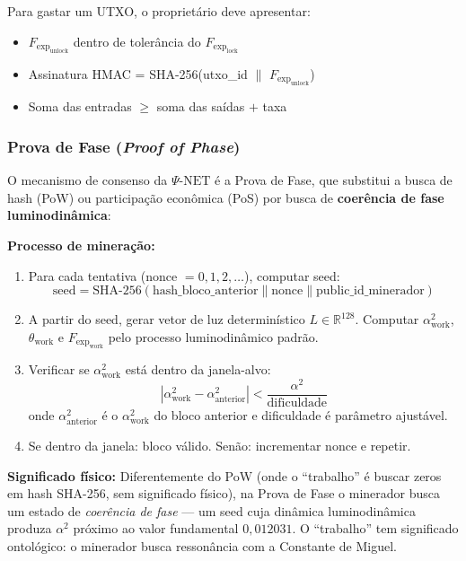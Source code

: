 \documentclass[12pt,a4paper]{article}
\newcommand{\alphaii}{\alpha^2}
\newcommand{\Fexp}{F_{\text{exp}}}
\newcommand{\PsiNet}{\Psi\text{-NET}}
\begin{document}
Para gastar um UTXO, o proprietário deve apresentar:
\begin{itemize}[nosep]
\item $\Fexp_{\text{unlock}}$ dentro de tolerância do
  $\Fexp_{\text{lock}}$
\item Assinatura HMAC = SHA-256(utxo\_id $\|$
  $\Fexp_{\text{unlock}}$)
\item Soma das entradas $\geq$ soma das saídas $+$ taxa
\end{itemize}

\subsubsection{Prova de Fase (\textit{Proof of Phase})}

O mecanismo de consenso da $\PsiNet$ é a Prova de Fase, que
substitui a busca de hash (PoW) ou participação econômica (PoS)
por busca de \textbf{coerência de fase luminodinâmica}:

\textbf{Processo de mineração:}
\begin{enumerate}[nosep]
\item Para cada tentativa (nonce $= 0, 1, 2, \ldots$),
  computar seed:
  \begin{equation}
  \text{seed} = \text{SHA-256}(
    \text{hash\_bloco\_anterior} \|
    \text{nonce} \|
    \text{public\_id\_minerador})
  \end{equation}

\item A partir do seed, gerar vetor de luz determinístico
  $L \in \mathbb{R}^{128}$. Computar $\alphaii_{\text{work}}$,
  $\theta_{\text{work}}$ e $\Fexp_{\text{work}}$ pelo processo
  luminodinâmico padrão.

\item Verificar se $\alphaii_{\text{work}}$ está dentro da
  janela-alvo:
  \begin{equation}
  |\alphaii_{\text{work}} - \alphaii_{\text{anterior}}| <
    \frac{\alphaii}{\text{dificuldade}}
  \label{eq:janela}
  \end{equation}
  onde $\alphaii_{\text{anterior}}$ é o $\alphaii_{\text{work}}$
  do bloco anterior e dificuldade é parâmetro ajustável.

\item Se dentro da janela: bloco válido. Senão: incrementar
  nonce e repetir.
\end{enumerate}

\textbf{Significado físico:} Diferentemente do PoW (onde o
``trabalho'' é buscar zeros em hash SHA-256, sem significado
físico), na Prova de Fase o minerador busca um estado de
\textit{coerência de fase} --- um seed cuja dinâmica
luminodinâmica produza $\alphaii$ próximo ao valor fundamental
$0{,}012031$. O ``trabalho'' tem significado ontológico: o
minerador busca ressonância com a Constante de Miguel.
\end{document}
